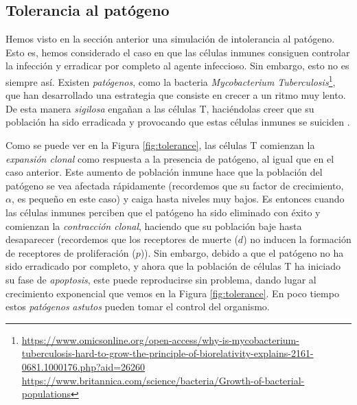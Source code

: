 
\subsection{Tolerancia al patógeno}
\label{sim:toler}

Hemos visto en la sección anterior una simulación de intolerancia al patógeno. Esto es, hemos considerado el caso en que las células inmunes consiguen controlar la infección y erradicar por completo al agente infeccioso. Sin embargo, esto no es siempre así. Existen \textit{patógenos}, como la bacteria \textit{Mycobacterium Tuberculosis}\footnote{\url{https://www.omicsonline.org/open-access/why-is-mycobacterium-tuberculosis-hard-to-grow-the-principle-of-biorelativity-explains-2161-0681.1000176.php?aid=26260} \\ \url{https://www.britannica.com/science/bacteria/Growth-of-bacterial-populations}}, que han desarrollado una estrategia que consiste en crecer a un ritmo muy lento. De esta manera \textit{sigilosa} engañan a las células T, haciéndolas creer que su población ha sido erradicada y provocando que estas células inmunes se suiciden \citep{leggett2017growth}.

Como se puede ver en la Figura \ref{fig:tolerance}, las células T comienzan la \textit{expansión clonal} como respuesta a la presencia de patógeno, al igual que en el caso anterior. Este aumento de población inmune hace que la población del patógeno se vea afectada rápidamente (recordemos que su factor de crecimiento, $\alpha$, es pequeño en este caso) y caiga hasta niveles muy bajos. Es entonces cuando las células inmunes perciben que el patógeno ha sido eliminado con éxito y comienzan la \textit{contracción clonal}, haciendo que su población baje hasta desaparecer (recordemos que los receptores de muerte ($d$) no inducen la formación de receptores de proliferación ($p$)). Sin embargo, debido a que el patógeno no ha sido erradicado por completo, y ahora que la población de células T ha iniciado su fase de \textit{apoptosis}, este puede reproducirse sin problema, dando lugar al crecimiento exponencial que vemos en la Figura \ref{fig:tolerance}. En poco tiempo estos \textit{patógenos} \textit{astutos} pueden tomar el control del organismo. 

